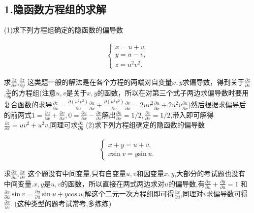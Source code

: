 \documentclass{ctexart}
\begin{document}
\subsection*{1.隐函数方程组的求解}

\noindent (1)求下列方程组确定的隐函数的偏导数

\begin{eqnarray}
\begin{cases}
x=u+v,\\
y=u-v,\\
z=u^{2}v^{2}.
\end{cases}
\end{eqnarray}

求$\frac{\partial z}{\partial x}$,$\frac{\partial z}{\partial y}$
\newline
\newline
\newline
这类题一般的解法是在各个方程的两端对自变量$x,y$求偏导数，得到关于$\frac{\partial z}{\partial x}$,$\frac{\partial z}{\partial y}$的方程组(注意$u,v$是关于$x,y$的函数，所以在对第三个式子两边求偏导数时要用复合函数的求导$\frac{\partial z}{\partial x}=\frac{\partial (u^{2}v^{2})}{\partial u}\frac{\partial u}{\partial x}+\frac{\partial (u^{2}v^{2})}{\partial v}\frac{\partial v}{\partial x}=2uv^{2}\frac{\partial u}{\partial x}+2u^{2}v\frac{\partial u}{\partial x}$)然后根据求偏导后的前两式$1=\frac{\partial u}{\partial x}+\frac{\partial v}{\partial x},0=\frac{\partial u}{\partial x}-\frac{\partial v}{\partial x}$解出$\frac{\partial u}{\partial x}=1/2,\frac{\partial v}{\partial x}=1/2$,带入即可解得$\frac{\partial z}{\partial x}=uv^{2}+u^{2}v$,同理可求$\frac{\partial z}{\partial y}$
\newline
\newline
\newline
\noindent (2)求下列方程组确定的隐函数的偏导数

\begin{eqnarray}
\begin{cases}
x+y=u+v,\\
x\mathrm{sin}\ v=y\mathrm{sin}\ u.
\end{cases}
\end{eqnarray}

求$\frac{\partial x}{\partial u}$,$\frac{\partial x}{\partial v}$
\newline
\newline
这个题没有中间变量,只有自变量$u,v$和因变量$x,y$,大部分的考试题也没有中间变量.$x,y$是$u,v$的函数，所以直接在两式两边求对$u$的偏导数,有$\frac{\partial x}{\partial u}+\frac{\partial y}{\partial u}=1$ 和$\frac{\partial x}{\partial u}\ \mathrm{sin}\ v=\frac{\partial y}{\partial u}\ \mathrm{sin}\ u+y\mathrm{cos}\ u$,解这个二元一次方程组即可得$\frac{\partial x}{\partial u}$,同理对$v$求偏导数可得$\frac{\partial x}{\partial v}$.
(这种类型的题考试常考,多练练)
\end{document}

